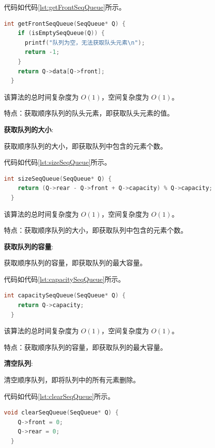 \documentclass[lang=cn,newtx,10pt,scheme=chinese]{elegantbook}
\begin{document}
代码如代码\ref{lst:getFrontSeqQueue}所示。

\begin{lstlisting}[language=C++, caption={获取队头元素示例代码}, label={lst:getFrontSeqQueue}]
  int getFrontSeqQueue(SeqQueue* Q) {
    if (isEmptySeqQueue(Q)) {
      printf("队列为空，无法获取队头元素\n");
      return -1;
    }
    return Q->data[Q->front];
  }

\end{lstlisting}

该算法的总时间复杂度为 $O(1)$，空间复杂度为 $O(1)$。

特点：获取顺序队列的队头元素，即获取队头元素的值。

\textbf{获取队列的大小}:

获取顺序队列的大小，即获取队列中包含的元素个数。

代码如代码\ref{lst:sizeSeqQueue}所示。

\begin{lstlisting}[language=C++, caption={获取队列的大小示例代码}, label={lst:sizeSeqQueue}]
  int sizeSeqQueue(SeqQueue* Q) {
    return (Q->rear - Q->front + Q->capacity) % Q->capacity;
  }

\end{lstlisting}

该算法的总时间复杂度为 $O(1)$，空间复杂度为 $O(1)$。

特点：获取顺序队列的大小，即获取队列中包含的元素个数。

\textbf{获取队列的容量}:

获取顺序队列的容量，即获取队列的最大容量。

代码如代码\ref{lst:capacitySeqQueue}所示。

\begin{lstlisting}[language=C++, caption={获取队列的容量示例代码}, label={lst:capacitySeqQueue}]
  int capacitySeqQueue(SeqQueue* Q) {
    return Q->capacity;
  }

\end{lstlisting}

该算法的总时间复杂度为 $O(1)$，空间复杂度为 $O(1)$。

特点：获取顺序队列的容量，即获取队列的最大容量。

\textbf{清空队列}:

清空顺序队列，即将队列中的所有元素删除。

代码如代码\ref{lst:clearSeqQueue}所示。

\begin{lstlisting}[language=C++, caption={清空队列示例代码}, label={lst:clearSeqQueue}]
  void clearSeqQueue(SeqQueue* Q) {
    Q->front = 0;
    Q->rear = 0;
  }

\end{lstlisting}
\end{document}

